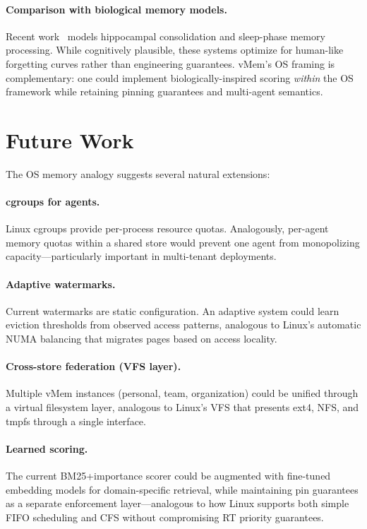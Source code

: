 \documentclass[10pt,twocolumn]{article}
\begin{document}
\paragraph{Comparison with biological memory models.} Recent work~\cite{humaninspired2026,episodicsemantic2026} models hippocampal consolidation and sleep-phase memory processing. While cognitively plausible, these systems optimize for human-like forgetting curves rather than engineering guarantees. vMem's OS framing is complementary: one could implement biologically-inspired scoring \emph{within} the OS framework while retaining pinning guarantees and multi-agent semantics.

\section{Future Work}
\label{sec:future}

The OS memory analogy suggests several natural extensions:

\paragraph{cgroups for agents.} Linux cgroups provide per-process resource quotas. Analogously, per-agent memory quotas within a shared store would prevent one agent from monopolizing capacity---particularly important in multi-tenant deployments.

\paragraph{Adaptive watermarks.} Current watermarks are static configuration. An adaptive system could learn eviction thresholds from observed access patterns, analogous to Linux's automatic NUMA balancing that migrates pages based on access locality.

\paragraph{Cross-store federation (VFS layer).} Multiple vMem instances (personal, team, organization) could be unified through a virtual filesystem layer, analogous to Linux's VFS that presents ext4, NFS, and tmpfs through a single interface.

\paragraph{Learned scoring.} The current BM25+importance scorer could be augmented with fine-tuned embedding models for domain-specific retrieval, while maintaining pin guarantees as a separate enforcement layer---analogous to how Linux supports both simple FIFO scheduling and CFS without compromising RT priority guarantees.
\end{document}
